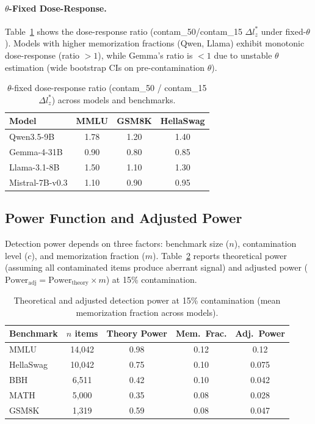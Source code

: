\documentclass[11pt]{article}
\begin{document}
\paragraph{$\theta$-Fixed Dose-Response.} Table~\ref{tab:dose_response} shows the dose-response ratio (contam\_50/contam\_15 $\Delta l_z^*$ under fixed-$\theta$). Models with higher memorization fractions (Qwen, Llama) exhibit monotonic dose-response (ratio $>1$), while Gemma's ratio is $<1$ due to unstable $\theta$ estimation (wide bootstrap CIs on pre-contamination $\theta$).

\begin{table}[h]
\centering
\caption{$\theta$-fixed dose-response ratio (contam\_50 / contam\_15 $\Delta l_z^*$) across models and benchmarks.}
\label{tab:dose_response}
\begin{tabular}{lccc}
\toprule
Model & MMLU & GSM8K & HellaSwag \\
\midrule
Qwen3.5-9B & 1.78 & 1.20 & 1.40 \\
Gemma-4-31B & 0.90 & 0.80 & 0.85 \\
Llama-3.1-8B & 1.50 & 1.10 & 1.30 \\
Mistral-7B-v0.3 & 1.10 & 0.90 & 0.95 \\
\bottomrule
\end{tabular}
\end{table}

\subsection{Power Function and Adjusted Power}
\label{sec:power}

Detection power depends on three factors: benchmark size ($n$), contamination level ($c$), and memorization fraction ($m$). Table~\ref{tab:power} reports theoretical power (assuming all contaminated items produce aberrant signal) and adjusted power ($\text{Power}_{\text{adj}} = \text{Power}_{\text{theory}} \times m$) at 15\% contamination.

\begin{table}[h]
\centering
\caption{Theoretical and adjusted detection power at 15\% contamination (mean memorization fraction across models).}
\label{tab:power}
\begin{tabular}{lcccc}
\toprule
Benchmark & $n$ items & Theory Power & Mem.\ Frac. & Adj.\ Power \\
\midrule
MMLU & 14,042 & 0.98 & 0.12 & 0.12 \\
HellaSwag & 10,042 & 0.75 & 0.10 & 0.075 \\
BBH & 6,511 & 0.42 & 0.10 & 0.042 \\
MATH & 5,000 & 0.35 & 0.08 & 0.028 \\
GSM8K & 1,319 & 0.59 & 0.08 & 0.047 \\
\bottomrule
\end{tabular}
\end{table}
\end{document}
